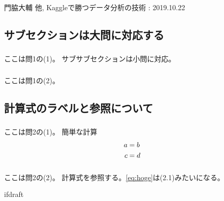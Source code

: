 \documentclass{jsarticle}
\begin{document}
    \begin{thebibliography}{1}
         門脇大輔 他, Kaggleで勝つデータ分析の技術 : 2019.10.22
    \end{thebibliography}

    \subsection{サブセクションは大問に対応する}

    \subsubsection{}

    ここは問1の(1)。
    サブサブセクションは小問に対応。

    \subsubsection{}

    ここは問1の(2)。


    \subsection{計算式のラベルと参照について}

    \subsubsection{}

    ここは問2の(1)。
    簡単な計算
    \begin{align}
        a &= b \notag \\
        c &= d \label{eq:hoge} %
    \end{align}

    \subsubsection{}

    ここは問2の(2)。
    計算式を参照する。\eqref{eq:hoge}は(2.1)みたいになる。

    \expandafter\ifx\csname ifdraft\endcsname\relax
\end{document}
